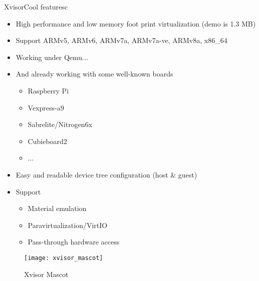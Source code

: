 \documentclass[english,slidetop,9pt,aspectratio=169]{beamer}
\begin{document}
  \begin{myframe}[2]{Xvisor}{Cool features}{c}
    \begin{minipage}{0.54\textwidth}
      \begin{itemize}
      \item High performance and low memory foot print virtualization (demo is 1.3 MB)
      \item Support ARMv5, ARMv6, ARMv7a, ARMv7a-ve, ARMv8a, x86\_64
      \item Working under Qemu...
      \item And already working with some well-known boards
        \begin{itemize}
        \item Raspberry Pi
        \item Vexpress-a9
        \item Sabrelite/Nitrogen6x
        \item Cubieboard2
        \item ...
        \end{itemize}
      \item Easy and readable device tree configuration (host \& guest)
      \item Support
        \begin{itemize}
        \item Material emulation
        \item Paravirtualization/VirtIO
        \item Pass-through hardware access
        \end{itemize}
      \end{itemize}
    \end{minipage}
    \begin{minipage}{0.45\textwidth}
      \begin{figure}[h!]
        \centering
        \texttt{[image: xvisor\_mascot]}
        \caption{Xvisor Mascot}
      \end{figure}
    \end{minipage}
  \end{myframe}
\end{document}
